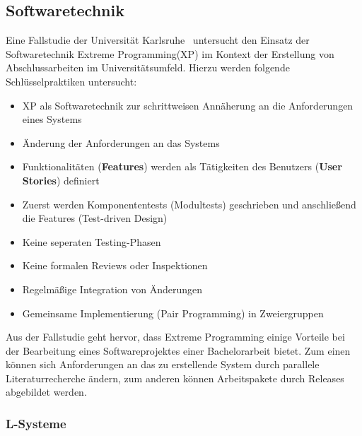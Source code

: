\subsection{Softwaretechnik}

Eine Fallstudie der Universität Karlsruhe~\cite{muller_2001} untersucht den Einsatz der Softwaretechnik Extreme
Programming(XP) im Kontext der Erstellung von Abschlussarbeiten im Universitätsumfeld.
Hierzu werden folgende Schlüsselpraktiken untersucht:
\begin{itemize}
    \item XP als Softwaretechnik zur schrittweisen Annäherung an die Anforderungen eines Systems
    \item Änderung der Anforderungen an das Systems
    \item Funktionalitäten (\textbf{Features}) werden als Tätigkeiten des Benutzers (\textbf{User Stories}) definiert
    \item Zuerst werden Komponententests (Modultests) geschrieben und anschließend die Features (Test-driven Design)
    \item Keine seperaten Testing-Phasen
    \item Keine formalen Reviews oder Inspektionen
    \item Regelmäßige Integration von Änderungen
    \item Gemeinsame Implementierung (Pair Programming) in Zweiergruppen
\end{itemize}
Aus der Fallstudie geht hervor, dass Extreme Programming einige Vorteile bei der Bearbeitung eines Softwareprojektes
einer Bachelorarbeit bietet.
Zum einen können sich Anforderungen an das zu erstellende System durch parallele Literaturrecherche ändern, zum
anderen können Arbeitspakete durch Releases abgebildet werden.

\subsubsection{L-Systeme}

